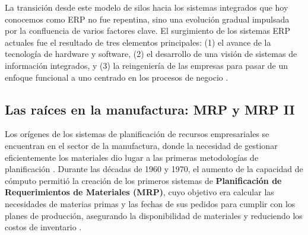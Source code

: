 \documentclass[12pt,letterpaper,spanish]{report}
\begin{document}
La transición desde este modelo de silos hacia los sistemas integrados que hoy conocemos como ERP no fue repentina, sino una evolución gradual impulsada por la confluencia de varios factores clave. El surgimiento de los sistemas ERP actuales fue el resultado de tres elementos principales: (1) el avance de la tecnología de hardware y software, (2) el desarrollo de una visión de sistemas de información integrados, y (3) la reingeniería de las empresas para pasar de un enfoque funcional a uno centrado en los procesos de negocio \cite{book}.

\subsection{Las raíces en la manufactura: MRP y MRP II}
%
%

Los orígenes de los sistemas de planificación de recursos empresariales se encuentran en el sector de la manufactura, donde la necesidad de gestionar eficientemente los materiales dio lugar a las primeras metodologías de planificación \citep{book,Miño-Cascante_Saumell-Fonseca_Toledo-Borrego_Roldan-Ruenes_Moreno-García_2015}. Durante las décadas de 1960 y 1970, el aumento de la capacidad de cómputo permitió la creación de los primeros sistemas de \textbf{Planificación de Requerimientos de Materiales (MRP)}, cuyo objetivo era calcular las necesidades de materias primas y las fechas de sus pedidos para cumplir con los planes de producción, asegurando la disponibilidad de materiales y reduciendo los costos de inventario \citep{book}.
\end{document}
